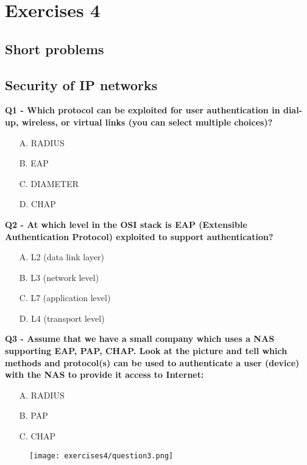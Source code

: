 \chapter*{Exercises 4}
\section*{Short problems}

\section*{Security of IP networks}
\textbf{Q1 - Which protocol can be exploited for user authentication in dial-up, wireless, or virtual links (you can select multiple choices)?}
\begin{itemize}
    \item[A.] RADIUS
    \item[B.] EAP
    \item[C.] DIAMETER
    \item[D.] CHAP
\end{itemize}

\textbf{Q2 - At which level in the OSI stack is EAP (Extensible Authentication Protocol) exploited to support authentication?}
\begin{itemize}
    \item[A.] L2 (data link layer)
    \item[B.] L3 (network level)
    \item[C.] L7 (application level)
    \item[D.] L4 (transport level)
\end{itemize}

\textbf{Q3 - Assume that we have a small company which uses a NAS supporting EAP, PAP, CHAP. Look at the picture and tell which methods and protocol(s) can be used to authenticate a user (device) with the NAS to provide it access to Internet:}
\begin{itemize}
    \item[A.] RADIUS
    \item[B.] PAP
    \item[C.] CHAP
\end{itemize}
\begin{figure}[h]
    \centering
    \texttt{[image: exercises4/question3.png]}
\end{figure}
  
